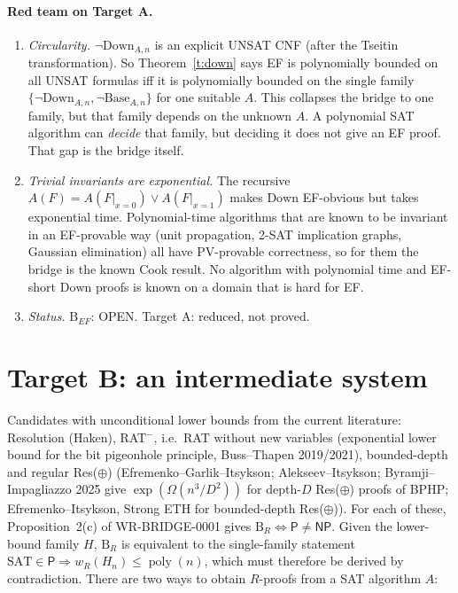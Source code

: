 \documentclass[11pt]{article}
\newcommand{\SAT}{\mathrm{SAT}}
\newcommand{\Pc}{\mathsf P}
\newcommand{\NP}{\mathsf{NP}}
\newcommand{\poly}{\operatorname{poly}}
\newcommand{\Down}{\mathrm{Down}}
\newcommand{\Base}{\mathrm{Base}}
\begin{document}
\paragraph{Red team on Target A.}
\begin{enumerate}
\item \emph{Circularity.} $\neg\Down_{A,n}$ is an explicit UNSAT CNF
(after the Tseitin transformation). So Theorem~\ref{t:down} says EF is
polynomially bounded on all UNSAT formulas iff it is polynomially bounded on
the single family $\{\neg\Down_{A,n},\neg\Base_{A,n}\}$ for one suitable $A$.
This collapses the bridge to one family, but that family depends on the
unknown $A$. A polynomial SAT algorithm can \emph{decide} that family, but
deciding it does not give an EF proof. That gap is the bridge itself.
\item \emph{Trivial invariants are exponential.} The recursive
$A(F)=A(F|_{x=0})\vee A(F|_{x=1})$ makes $\Down$ EF-obvious but takes
exponential time. Polynomial-time algorithms that are known to be invariant in an
EF-provable way (unit propagation, 2-SAT implication graphs, Gaussian
elimination) all have $\mathrm{PV}$-provable correctness, so for them the
bridge is the known Cook result. No algorithm with polynomial time and
EF-short $\Down$ proofs is known on a domain that is hard for EF.
\item \emph{Status.} $\mathrm B_{EF}$: OPEN. Target A: reduced, not proved.
\end{enumerate}

\section{Target B: an intermediate system}
Candidates with unconditional lower bounds from the current literature:
Resolution (Haken), RAT$^-$, i.e.\ RAT without new variables (exponential
lower bound for the bit pigeonhole principle, Buss--Thapen 2019/2021),
bounded-depth and regular Res($\oplus$) (Efremenko--Garlik--Itsykson;
Alekseev--Itsykson; Byramji--Impagliazzo 2025 give
$\exp(\Omega(n^3/D^2))$ for depth-$D$ Res($\oplus$) proofs of BPHP;
Efremenko--Itsykson, Strong ETH for bounded-depth Res($\oplus$)).
For each of these, Proposition~2(c) of WR-BRIDGE-0001 gives
$\mathrm B_R\Leftrightarrow\Pc\ne\NP$. Given the lower-bound family
$H$, $\mathrm B_R$ is equivalent to the single-family statement
$\SAT\in\Pc\Rightarrow w_R(H_n)\le\poly(n)$, which must therefore be
derived by contradiction. There are two ways to obtain $R$-proofs from a
SAT algorithm $A$:
\end{document}
